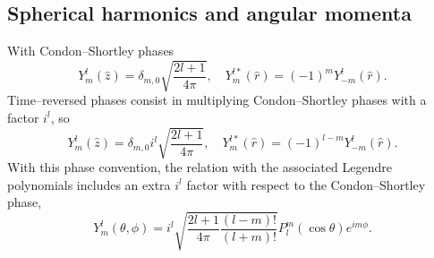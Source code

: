 \begin{subappendices}
\section{Spherical harmonics and angular momenta}\label{C7AppD}
With Condon--Shortley phases
\begin{equation}\label{eq20}
Y_m^l(\hat z)=\delta_{m,0} \sqrt{\frac{2l+1}{4 \pi}}, \quad Y_m^{l*}(\hat r)=(-1)^m Y_{-m}^l(\hat r).
\end{equation}
Time--reversed phases consist in multiplying Condon--Shortley phases with a factor $i^l$, so
\begin{equation}\label{eq21}
Y_m^l(\hat z)=\delta_{m,0} i^l \sqrt{\frac{2l+1}{4 \pi}}, \quad Y_m^{l*}(\hat r)=(-1)^{l-m} Y_{-m}^l(\hat r).
\end{equation}
With this phase convention, the relation with the associated Legendre polynomials includes an extra $i^l$ factor with respect to the Condon--Shortley phase,
\begin{equation}\label{eq120}
Y_m^l(\theta,\phi)=i^l \sqrt{\frac{2l+1}{4\pi}\frac{(l-m)!}{(l+m)!}}P_l^m(\cos \theta)e^{im\phi}.
\end{equation}

\end{subappendices}
